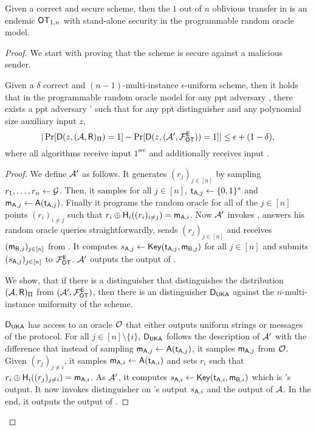  
\begin{theorem}\label{thm:KAtoOT}

Given a correct and secure \UKA scheme, then the $1$ out of $n$ oblivious transfer in    is an endemic $\mathsf{OT}_{1,n}$ with stand-alone security in the programmable random oracle model. 

\end{theorem}

\begin{proof}

We start with proving that the scheme is secure against a malicious sender. 
\begin{claim}\label{claim:malsender}
Given a $\delta$ correct and  $(n-1)$-multi-instance $\epsilon$-uniform \UKA scheme, then it holds that in the programmable random oracle model for any ppt adversary \Adv, there exists a ppt adversary \Adv' such that for any ppt distinguisher \D and any polynomial size auxiliary input $z$,
$$
|\Pr[\mathsf D(z,(\mathcal{A},\mathsf{R})_{\Pi})=1] -\Pr[\mathsf D(z, (\mathcal{A}', \mathcal{F}_{\mathsf{OT}}^\mathsf{E}))=1]|\leq \epsilon+(1-\delta),
$$
where all algorithms receive input $1^\sec$ and \rec additionally receives input \set.
\end{claim}

\begin{proof}
We define $\mathcal{A}'$ as follows. 
It generates $(r_j)_{j\in[n]}$ by sampling $r_1,\dots, r_n\leftarrow \mathcal{G}$. Then, it samples for all $j\in[n]$, $\mathsf{t}_{\mathsf{A},j}\leftarrow\{0,1\}^*$ and $\mathsf{m}_{\mathsf{A},j}\leftarrow\mathsf{A}(\mathsf{t}_{\mathsf{A},j})$. Finally it programs the random oracle for all of the $j\in[n]$ points $(r_i)_{i\neq j}$ such that $r_i\oplus\mathsf{H}_i((r_i)_{i\neq j})=\mathsf{m}_{\mathsf{A},i}$. Now $\mathcal{A}'$ invokes \Adv, answers his random oracle queries straightforwardly, sends $(r_j)_{j\in[n]}$ and receives $(\mathsf{m}_{\mathsf{B},j})_{j\in[n]}$ from \Adv. It computes $s_{\mathsf{A},j}\leftarrow\mathsf{Key}(\mathsf{t}_{\mathsf{A},j},\mathsf{m}_{\mathsf{B},j})$ for all $j\in[n]$ and submits $(s_{\mathsf{A},j})_{j\in [n]}$ to $\mathcal{F}_{\mathsf{OT}}^{\mathsf{E}}$. $\mathcal{A}'$ outputs the output of \Adv.

We show, that if there is a distinguisher \D that distinguishes the distribution $(\mathcal{A},\mathsf{R})_{\Pi}$ from $(\mathcal{A}',\mathcal{F}_{\mathsf{OT}}^{\mathsf{E}})$, then there is an distinguisher $\mathsf D_{\mathsf{UKA}}$ against the $n$-multi-instance uniformity of the \UKA scheme. 

$\mathsf D_{\mathsf{UKA}}$ has access to an oracle $\mathcal{O}$ that either outputs uniform strings or messages of the \UKA protocol. For all $j\in[n]\setminus\{i\}$, $\mathsf D_{\mathsf{UKA}}$ follows the description of $\mathcal{A}'$ with the difference that instead of sampling  $\mathsf{m}_{\mathsf{A},j}\leftarrow\mathsf{A}(\mathsf{t}_{\mathsf{A},j})$, it samples $\mathsf{m}_{\mathsf{A},j}$ from $\mathcal{O}$. Given $(r_j)_{j\neq i}$, it samples $\mathsf{m}_{\mathsf{A},i}\leftarrow\mathsf{A}(\mathsf{t}_{\mathsf{A},i})$ and sets $r_i$ such that $r_i\oplus\mathsf{H}_i((r_j)_{j\neq i})=\mathsf{m}_{\mathsf{A},i}$. As $\mathcal{A}'$, it computes $s_{\mathsf{A},i}\leftarrow\mathsf{Key}(\mathsf{t}_{\mathsf{A},i},\mathsf{m}_{\mathsf{B},i})$ which is \rec's output. It now invokes distinguisher \D on \rec's output $s_{\mathsf{A},i}$ and the output of $\mathcal{A}$. In the end, it outputs the output of \D.



\end{proof}
\end{proof}
